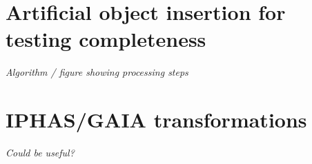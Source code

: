 \documentclass[a4paper,useAMS,usenatbib]{mn2e}
\begin{document}
\appendix

\section[]{Artificial object insertion for testing completeness}
\textsl{Algorithm / figure showing processing steps}

\section[]{IPHAS/GAIA transformations}
\textsl{Could be useful?}




\end{document}
